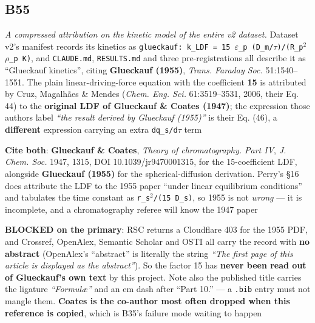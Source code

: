 \documentclass[10pt]{article}
\begin{document}
\subsection*{B55}\label{led:B55}
\begin{description}[leftmargin=0pt,itemsep=1pt]
\item[Defect.] \emph{A compressed attribution on the kinetic model of the entire v2 dataset.} Dataset v2's manifest records its kinetics as \texttt{glueckauf: k\_LDF = 15 $\varepsilon$\_p (D\_m/$\tau$)/(R\_p$^2$ $\rho$\_p K)}, and \texttt{CLAUDE.md}, \texttt{RESULTS.md} and three pre-registrations all describe it as ``Glueckauf kinetics'', citing \textbf{Glueckauf (1955)}, \emph{Trans. Faraday Soc.} 51:1540--1551. The plain linear-driving-force equation with the coefficient \textbf{15} is attributed by Cruz, Magalh\~aes \& Mendes (\emph{Chem. Eng. Sci.} 61:3519--3531, 2006, their Eq. 44) to the \textbf{original LDF of Glueckauf \& Coates (1947)}; the expression those authors label \emph{``the result derived by Glueckauf (1955)''} is their Eq. (46), a \textbf{different} expression carrying an extra \texttt{dq\_s/d$\tau$} term
\item[Resolution.] \textbf{Cite both}: \textbf{Glueckauf \& Coates}, \emph{Theory of chromatography. Part IV}, \emph{J. Chem. Soc.} 1947, 1315, DOI 10.1039/jr9470001315, for the 15-coefficient LDF, alongside \textbf{Glueckauf (1955)} for the spherical-diffusion derivation. Perry's §16 does attribute the LDF to the 1955 paper ``under linear equilibrium conditions'' and tabulates the time constant as \texttt{r\_s$^2$/(15 D\_s)}, so 1955 is not \emph{wrong} --- it is incomplete, and a chromatography referee will know the 1947 paper
\item[Note.] \textbf{BLOCKED on the primary}: RSC returns a Cloudflare 403 for the 1955 PDF, and Crossref, OpenAlex, Semantic Scholar and OSTI all carry the record with \textbf{no abstract} (OpenAlex's ``abstract'' is literally the string \emph{``The first page of this article is displayed as the abstract''}). So the factor 15 has \textbf{never been read out of Glueckauf's own text} by this project. Note also the published title carries the ligature \emph{``Formulæ''} and an em dash after ``Part 10.'' --- a \texttt{.bib} entry must not mangle them. \textbf{Coates is the co-author most often dropped when this reference is copied}, which is B35's failure mode waiting to happen
\end{description}
\end{document}
